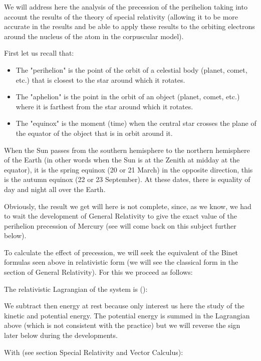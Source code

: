	We will address here the analysis of the precession of the perihelion taking into account the results of the theory of special relativity (allowing it to be more accurate in the results and be able to apply these results to the orbiting electrons around the nucleus of the atom in the corpuscular model).
	
	First let us recall that:
	\begin{itemize}
		\item The "perihelion" is the point of the orbit of a celestial body (planet, comet, etc.) that is closest to the star around which it rotates.

		\item The "aphelion" is the point in the orbit of an object (planet, comet, etc.) where it is farthest from the star around which it rotates.

		\item The "equinox" is the moment (time) when the central star crosses the plane of the equator of the object that is in orbit around it.
	\end{itemize}
	\begin{tcolorbox}[title=Remark,colframe=black,arc=10pt]
	When the Sun passes from the southern hemisphere to the northern hemisphere of the Earth (in other words when the Sun is at the Zenith at midday at the equator), it is the spring equinox (20 or 21 March) in the opposite direction, this is the autumn equinox (22 or 23 September). At these dates, there is equality of day and night all over the Earth.
	\end{tcolorbox}
	Obviously, the result we get will here is not complete, since, as we know, we had to wait the development of General Relativity to give the exact value of the perihelion  precession of Mercury (see will come back on this subject further below).

	To calculate the effect of precession, we will seek the equivalent of the Binet formulas seen above in relativistic form (we will see the classical form in the section of General Relativity). For this we proceed as follows:

	The relativistic Lagrangian of the system is ():
	
	\begin{tcolorbox}[title=Remark,colframe=black,arc=10pt]
	We subtract then energy at rest because only interest us here the study of the kinetic and potential energy. The potential energy is summed in the Lagrangian above (which is not consistent with the practice) but we will reverse the sign later below during the developments.
	\end{tcolorbox}
	With (see section Special Relativity and Vector Calculus):
	
